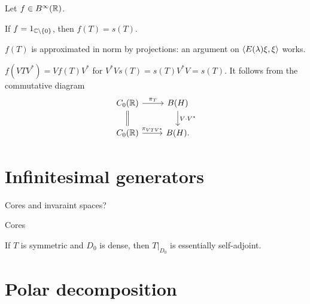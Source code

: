\documentclass{../../large}
\begin{document}
\begin{prb}
Let $f\in B^\infty(\mathbb{R})$.
\begin{parts}
\item If $f=1_{\mathbb{C}\setminus\{0\}}$, then $f(T)=s(T)$.
\item $f(T)$ is approximated in norm by projections: an argument on $\langle E(\lambda)\xi,\xi\rangle$ works.
\item $f(VTV^*)=Vf(T)V^*$ for $V^*Vs(T)=s(T)V^*V=s(T)$. It follows from the commutative diagram
\[\begin{tikzcd}
C_0(\R)\ar[equals]{d}\ar{r}{\pi_T} & B(H) \ar{d}{V\cdot V^*}\\
C_0(\R)\ar{r}{\pi_{VTV^*}} & B(H).
\end{tikzcd}\]
\end{parts}
\end{prb}


\section{Infinitesimal generators}


\begin{prb}
\end{prb}

Cores and invaraint spaces?


\begin{prb}
Cores
\begin{parts}
\item If $T$ is symmetric and $D_0$ is dense, then $T|_{D_0}$ is essentially self-adjoint.
\end{parts}
\end{prb}

\begin{prb}
\end{prb}





\section{Polar decomposition}
\end{document}

